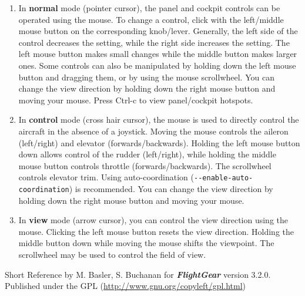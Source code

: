 \documentclass[10pt]{article}
\newcommand{\FlightGear}{{\itshape\bfseries FlightGear}}
\newcommand{\web}[1]{\href{#1}{#1}}
\begin{document}
 \begin{enumerate}
 \item In \textbf{normal} mode (pointer cursor), the panel and cockpit controls can be
 operated using the mouse. To change a control, click with the left/middle mouse button
 on the corresponding knob/lever. Generally, the left side of the control decreases the setting,
 while the right side increases the setting. The left mouse button makes small changes while the
 middle button makes larger ones. Some controls can also be manipulated by holding down the left
 mouse button and dragging them, or by using the mouse scrollwheel. You can change the view
 direction by holding down the right mouse button and moving your mouse.
 Press Ctrl-c to view panel/cockpit hotspots.

 \item In \textbf{control} mode (cross hair cursor), the mouse is used to directly control
 the aircraft in the absence of a joystick. Moving the mouse controls the aileron (left/right)
 and elevator (forwards/backwards). Holding the left mouse button down allows control of the rudder
 (left/right), while holding the middle mouse button controls throttle (forwards/backwards).
 The scrollwheel controls elevator trim. Using auto-coordination
 (\texttt{-$ $-enable-auto-coordination}) is recommended. You can change the view
 direction by holding down the right mouse button and moving your mouse.

 \item In \textbf{view} mode (arrow cursor), you can control the view direction using the mouse.
 Clicking the left mouse button resets the view direction. Holding the middle button down while
 moving the mouse shifts the viewpoint. The scrollwheel may be used to control the field of view.

\end{enumerate}

 \noindent
 Short Reference by M. Basler, S. Buchanan for \FlightGear{} version 3.2.0.\\
 Published under the GPL (\web{http://www.gnu.org/copyleft/gpl.html})
\end{document}
